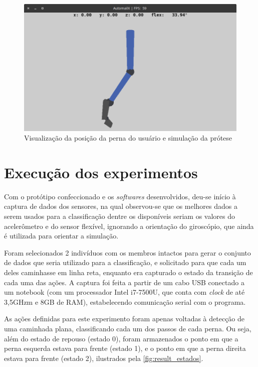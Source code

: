 \begin{figure}[ht]
	\caption{\label{fig:result_simulacao}Visualização da posição da perna do usuário e simulação da prótese}
	\begin{center}
	    \includegraphics[width=.8\textwidth]{resources/result_simulacao}
	\end{center}
\end{figure}

\section{Execução dos experimentos}\label{sec:result_execucao}

Com o protótipo confeccionado e os \textit{softwares} desenvolvidos, deu-se início à captura de dados dos sensores, na qual observou-se que os melhores dados a serem usados para a classificação dentre os disponíveis seriam os valores do acelerômetro e do sensor flexível, ignorando a orientação do giroscópio, que ainda é utilizada para orientar a simulação.

Foram selecionados 2 indivíduos com os membros intactos para gerar o conjunto de dados que seria utilizado para a classificação, e solicitado para que cada um deles caminhasse em linha reta, enquanto era capturado o estado da transição de cada uma das ações. A captura foi feita a partir de um cabo USB conectado a um notebook (com um processador Intel i7-7500U, que conta com \textit{clock} de até 3,5GHzm e 8GB de RAM), estabelecendo comunicação serial com o programa.

As ações definidas para este experimento foram apenas voltadas à detecção de uma caminhada plana, classificando cada um dos passos de cada perna. Ou seja, além do estado de repouso (estado 0), foram armazenados o ponto em que a perna esquerda estava para frente (estado 1), e o ponto em que a perna direita estava para frente (estado 2), ilustrados pela \autoref{fig:result_estados}.

